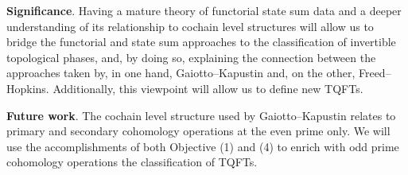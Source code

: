 \medskip\noindent\textbf{Significance}.
Having a mature theory of functorial state sum data and a deeper understanding of its relationship to cochain level structures will allow us to bridge the functorial and state sum approaches to the classification of invertible topological phases, and, by doing so, explaining the connection between the approaches taken by, in one hand, Gaiotto--Kapustin and, on the other, Freed--Hopkins.
Additionally, this viewpoint will allow us to define new TQFTs.

\medskip\noindent\textbf{Future work}.
The cochain level structure used by Gaiotto--Kapustin relates to primary and secondary cohomology operations at the even prime only.
We will use the accomplishments of both Objective (1) and (4) to enrich with odd prime cohomology operations the classification of TQFTs.



